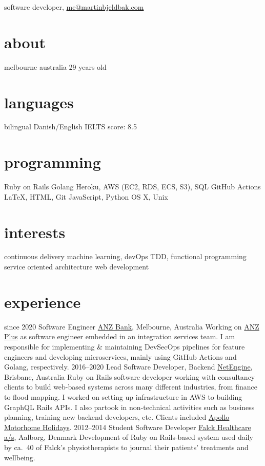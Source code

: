 \documentclass{afriggeri-cv/friggeri-cv}
\begin{document}
{software developer, \href{mailto:me@martinbjeldbak.com}{me@martinbjeldbak.com}}

\begin{aside}
  \section{about}
    melbourne
    australia
    \hfill
    29 years old
  \section{languages}
    bilingual Danish/English
    IELTS score: 8.5
  \section{programming}
    Ruby on Rails
    Golang
    Heroku, AWS (EC2, RDS, ECS, S3), SQL
    GitHub Actions
    \LaTeX, HTML, Git
    JavaScript, Python
    OS X, Unix
  \section{interests}
    continuous delivery
    machine learning, devOps
    TDD, functional programming
    service oriented architecture
    web development
\end{aside}

\section{experience}

\begin{entrylist}
  \entry%
    {since 2020}
    {Software Engineer}
    {\href{https://www.anz.com.au}{ANZ Bank}, Melbourne, Australia}
    {Working on \href{https://www.anz.com.au/plus}{ANZ Plus} as software engineer embedded in an
     integration services team. I am responsible for implementing \& maintaining DevSecOps pipelines
     for feature engineers and developing microservices, mainly using GitHub Actions and Golang, respectively.}
  \entry%
    {2016--2020}
    {Lead Software Developer, Backend}
    {\href{https://netengine.com.au/}{NetEngine}, Brisbane, Australia}
    {Ruby on Rails software developer working with consultancy clients to build web-based systems across
      many different industries, from finance to flood mapping. I worked on setting up infrastructure
      in AWS to building GraphQL Rails APIs.
      I also partook in non-technical activities such as business planning, training new backend developers,
      etc. Clients included \href{https://www.apollocamper.com}{Apollo Motorhome Holidays}.}
  \entry%
    {2012--2014}
    {Student Software Developer}
    {\href{https://www.falck.com/services/healthcare}{Falck Healthcare a/s}, Aalborg, Denmark}
    {Development of Ruby on Rails-based system used daily by ca.\ 40 of Falck's physiotherapists to journal their patients' treatments and wellbeing.}
\end{entrylist}
\end{document}
